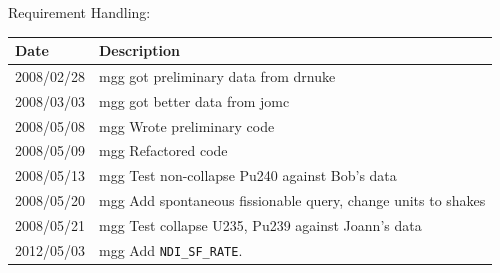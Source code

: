 \vspace{24pt}

Requirement Handling:

\begin{tabular}{|p{72pt}|p{351pt}|} \hline
Date & Description \\ \hline
2008/02/28 & mgg got preliminary data from drnuke \\ \hline 
2008/03/03 & mgg got better data from jomc \\ \hline 
2008/05/08 & mgg Wrote preliminary code \\ \hline
2008/05/09 & mgg Refactored code \\ \hline
2008/05/13 & mgg Test non-collapse Pu240 against Bob's data \\ \hline
2008/05/20 & mgg Add spontaneous fissionable query, change units to
shakes \\ \hline
2008/05/21 & mgg Test collapse U235, Pu239 against Joann's data \\
\hline
2012/05/03 & mgg Add \texttt{NDI\_SF\_RATE}. \\
\hline
\end{tabular}
